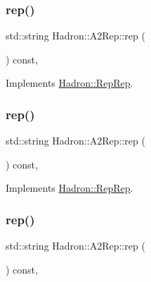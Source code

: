 \subsubsection{\texorpdfstring{rep()}{rep()}\hspace{0.1cm}{\footnotesize\ttfamily [1/5]}}
{\footnotesize\ttfamily std\+::string Hadron\+::\+A2\+Rep\+::rep (\begin{DoxyParamCaption}{ }\end{DoxyParamCaption}) const\hspace{0.3cm}{\ttfamily [inline]}, {\ttfamily [virtual]}}



Implements \mbox{\hyperlink{structHadron_1_1RepRep_ab3213025f6de249f7095892109575fde}{Hadron\+::\+Rep\+Rep}}.

\mbox{\label{structHadron_1_1A2Rep_a31e1135ddb204394f1c6153797a7dffa}} 
\subsubsection{\texorpdfstring{rep()}{rep()}\hspace{0.1cm}{\footnotesize\ttfamily [2/5]}}
{\footnotesize\ttfamily std\+::string Hadron\+::\+A2\+Rep\+::rep (\begin{DoxyParamCaption}{ }\end{DoxyParamCaption}) const\hspace{0.3cm}{\ttfamily [inline]}, {\ttfamily [virtual]}}



Implements \mbox{\hyperlink{structHadron_1_1RepRep_ab3213025f6de249f7095892109575fde}{Hadron\+::\+Rep\+Rep}}.

\mbox{\label{structHadron_1_1A2Rep_a31e1135ddb204394f1c6153797a7dffa}} 
\subsubsection{\texorpdfstring{rep()}{rep()}\hspace{0.1cm}{\footnotesize\ttfamily [3/5]}}
{\footnotesize\ttfamily std\+::string Hadron\+::\+A2\+Rep\+::rep (\begin{DoxyParamCaption}{ }\end{DoxyParamCaption}) const\hspace{0.3cm}{\ttfamily [inline]}, {\ttfamily [virtual]}}



